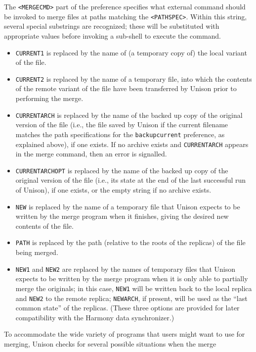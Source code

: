 \documentclass{article}
\begin{document}
The \verb|<MERGECMD>| part of the preference specifies what external command
should be invoked to merge files at paths matching the \verb|<PATHSPEC>|.
Within this string, several special substrings are recognized; these will be
substituted with appropriate values before invoking a sub-shell to execute
the command.
\begin{itemize}
\item \relax\verb|CURRENT1| is replaced by the name of (a temporary copy of)
  the local variant of the file.
\item \relax\verb|CURRENT2| is replaced by the name of a temporary
  file, into which the contents of the remote variant of the file have
  been transferred by Unison prior to performing the merge.
\item \relax\verb|CURRENTARCH| is replaced by the name of the backed up copy
  of the original version of the file (i.e., the file saved by Unison
  if the current filename matches the path specifications for the
  \verb|backupcurrent| preference, as explained above), if one exists.
  If no archive exists and \relax\verb|CURRENTARCH| appears in the
  merge command, then an error is signalled.
\item \relax\verb|CURRENTARCHOPT| is replaced by the name of the backed up copy
  of the original version of the file (i.e., its state at the end of
  the last successful run of Unison), if one exists, or the empty
  string if no archive exists.
\item \relax\verb|NEW| is replaced by the name of a temporary file
  that Unison expects to be written by the merge program when it
  finishes, giving the desired new contents of the file.
\item \relax\verb|PATH| is replaced by the path (relative to the roots of
  the replicas) of the file being merged.
\item \relax\verb|NEW1| and \relax\verb|NEW2| are replaced by the names of temporary files
  that Unison expects to be written by the merge program when it
  is only able to partially merge the originals; in this case, \verb|NEW1|
  will be written back to the local replica and \verb|NEW2| to the remote
  replica; \verb|NEWARCH|, if present, will be used as the ``last common
  state'' of the replicas.  (These three options are provided for
  later compatibility with the Harmony data synchronizer.)
\end{itemize}
To accommodate the wide variety of programs that users might want to use for
merging, Unison checks for several possible situations when the merge
\end{document}
